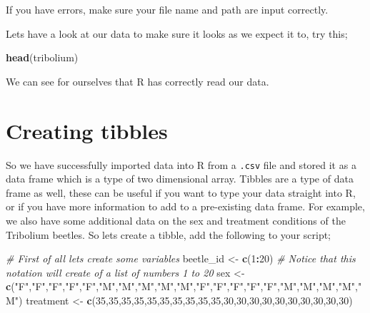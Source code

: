 \documentclass[
]{book}
\newenvironment{Shaded}{\begin{snugshade}}{\end{snugshade}}
\newcommand{\CommentTok}[1]{\textcolor[rgb]{0.56,0.35,0.01}{\textit{#1}}}
\newcommand{\DecValTok}[1]{\textcolor[rgb]{0.00,0.00,0.81}{#1}}
\newcommand{\FunctionTok}[1]{\textcolor[rgb]{0.13,0.29,0.53}{\textbf{#1}}}
\newcommand{\NormalTok}[1]{#1}
\newcommand{\OtherTok}[1]{\textcolor[rgb]{0.56,0.35,0.01}{#1}}
\newcommand{\SpecialCharTok}[1]{\textcolor[rgb]{0.81,0.36,0.00}{\textbf{#1}}}
\newcommand{\StringTok}[1]{\textcolor[rgb]{0.31,0.60,0.02}{#1}}
\begin{document}
If you have errors, make sure your file name and path are input correctly.

Lets have a look at our data to make sure it looks as we expect it to, try this;

\begin{Shaded}
\begin{Highlighting}[]
\FunctionTok{head}\NormalTok{(tribolium)}
\end{Highlighting}
\end{Shaded}

We can see for ourselves that R has correctly read our data.

\section{Creating tibbles}\label{creating-tibbles}

So we have successfully imported data into R from a \texttt{.csv} file and stored it as a data frame which is a type of two dimensional array. Tibbles are a type of data frame as well, these can be useful if you want to type your data straight into R, or if you have more information to add to a pre-existing data frame. For example, we also have some additional data on the sex and treatment conditions of the Tribolium beetles. So lets create a tibble, add the following to your script;

\begin{Shaded}
\begin{Highlighting}[]
\CommentTok{\# First of all lets create some variables}
\NormalTok{beetle\_id }\OtherTok{\textless{}{-}} \FunctionTok{c}\NormalTok{(}\DecValTok{1}\SpecialCharTok{:}\DecValTok{20}\NormalTok{) }\CommentTok{\# Notice that this notation will create of a list of numbers 1 to 20}
\NormalTok{sex }\OtherTok{\textless{}{-}} \FunctionTok{c}\NormalTok{(}\StringTok{"F"}\NormalTok{,}\StringTok{"F"}\NormalTok{,}\StringTok{"F"}\NormalTok{,}\StringTok{"F"}\NormalTok{,}\StringTok{"F"}\NormalTok{,}\StringTok{"M"}\NormalTok{,}\StringTok{"M"}\NormalTok{,}\StringTok{"M"}\NormalTok{,}\StringTok{"M"}\NormalTok{,}\StringTok{"M"}\NormalTok{,}\StringTok{"F"}\NormalTok{,}\StringTok{"F"}\NormalTok{,}\StringTok{"F"}\NormalTok{,}\StringTok{"F"}\NormalTok{,}\StringTok{"F"}\NormalTok{,}\StringTok{"M"}\NormalTok{,}\StringTok{"M"}\NormalTok{,}\StringTok{"M"}\NormalTok{,}\StringTok{"M"}\NormalTok{,}\StringTok{"M"}\NormalTok{)}
\NormalTok{treatment }\OtherTok{\textless{}{-}} \FunctionTok{c}\NormalTok{(}\DecValTok{35}\NormalTok{,}\DecValTok{35}\NormalTok{,}\DecValTok{35}\NormalTok{,}\DecValTok{35}\NormalTok{,}\DecValTok{35}\NormalTok{,}\DecValTok{35}\NormalTok{,}\DecValTok{35}\NormalTok{,}\DecValTok{35}\NormalTok{,}\DecValTok{35}\NormalTok{,}\DecValTok{35}\NormalTok{,}\DecValTok{30}\NormalTok{,}\DecValTok{30}\NormalTok{,}\DecValTok{30}\NormalTok{,}\DecValTok{30}\NormalTok{,}\DecValTok{30}\NormalTok{,}\DecValTok{30}\NormalTok{,}\DecValTok{30}\NormalTok{,}\DecValTok{30}\NormalTok{,}\DecValTok{30}\NormalTok{,}\DecValTok{30}\NormalTok{)}
\end{Highlighting}
\end{Shaded}
\end{document}
